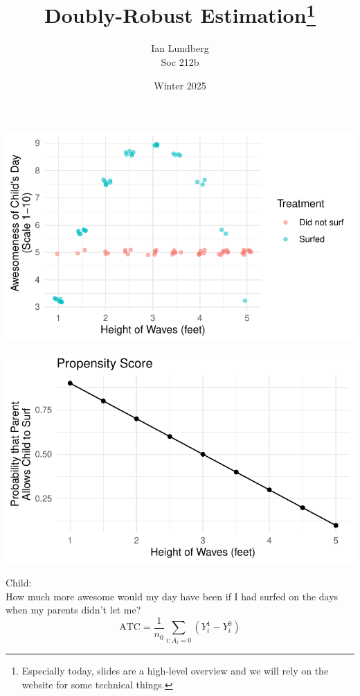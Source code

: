 \documentclass{beamer}
\title{Doubly-Robust Estimation\footnote{Especially today, slides are a high-level overview and we will rely on the website for some technical things.}}
\author{Ian Lundberg\\Soc 212b\\\bref{https://ilundberg.github.io/soc212b}{ilundberg.github.io/soc212b}}
\date{Winter 2025}
\newcommand{\goalsframe}{\begin{frame}{Learning goals for today}
At the end of class, you will be able to estimate average causal effects by modeling treatment assignment probabilities. \vskip .2in
Optional reading:
\begin{itemize}
\item Hernán and Robins 2020 Chapter 12.1--12.5, 13, 15.1
\end{itemize}
\end{frame}}
\begin{document}
\maketitle


\begin{frame}
\includegraphics[width = \textwidth]{figures/dr_y.pdf}
\end{frame}

\begin{frame}
\includegraphics[width = \textwidth]{figures/dr_pscore.pdf}
\end{frame}

\begin{frame}

Child:\\How much more awesome would my day have been if I had surfed on the days when my parents didn't let me?
$$
\text{ATC} = \frac{1}{n_0}\sum_{i:A_i=0} \left(Y_i^1 - Y_i^0\right)
$$

\end{frame}
\end{document}
